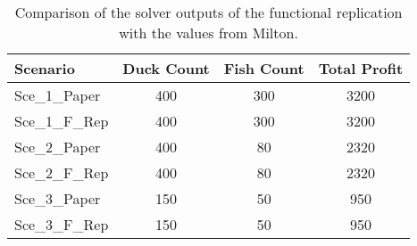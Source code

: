 \documentclass[sigconf, nonacm]{acmart}
\begin{document}
\begin{table}[htbp]
	\centering
	\begin{tabular}{lccc}
		\toprule
		\textbf{Scenario} & \textbf{Duck Count} & \textbf{Fish Count} & \textbf{Total Profit} \\
		\midrule
		Sce\_1\_Paper & 400 & 300 & 3200 \\
		Sce\_1\_F\_Rep & 400 & 300 & 3200 \\
		\midrule
		Sce\_2\_Paper & 400 & 80 & 2320 \\
		Sce\_2\_F\_Rep & 400 & 80 & 2320 \\
		\midrule
		Sce\_3\_Paper & 150 & 50 & 950 \\
		Sce\_3\_F\_Rep & 150 & 50 & 950 \\
		\bottomrule
	\end{tabular}
	\caption{Comparison of the solver outputs of the functional replication with the values from Milton\cite{Milton2009}.}
	\label{tab:replication_results_confirmation}
\end{table}





\end{document}
